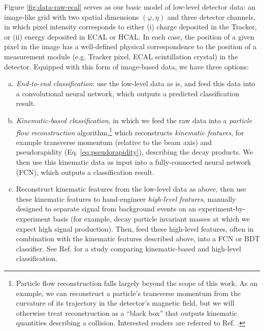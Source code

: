 \documentclass[11pt, a4paper]{article}
\begin{document}
Figure \ref{fig:data-raw-ecal} serves as our basic model of low-level detector data: an image-like grid with two spatial dimensions $ (\varphi, \eta) $ and three detector channels, in which pixel intensity corresponds to either (i) charge deposited in the Tracker, or (ii) energy deposited in ECAL or HCAL.
In each case, the position of a given pixel in the image has a well-defined physical correspondence to the position of a measurement module (e.g. Tracker pixel, ECAL scintillation crystal) in the detector.
Equipped with this form of image-based data, we have three options:
\begin{enumerate}[(a)]

    \item \textit{End-to-end classification}: use the low-level data as is, and feed this data into a convolutional neural network, which outputs a predicted classification result.

    \item \label{item:kinematic-classification} \textit{Kinematic-based classification}, in which we feed the raw data into a \textit{particle flow reconstruction} algorithm,\footnote{Particle flow reconstruction falls largely beyond the scope of this work.
    As an example, we can reconstruct a particle's transverse momentum from the curvature of its trajectory in the detector's magnetic field, but we will otherwise treat reconstruction as a ``black box'' that outputs kinematic quantities describing a collision.
    Interested readers are referred to Ref. \cite{particle-flow}.} which reconstructs \textit{kinematic features}, for example transverse momentum (relative to the beam axis) and pseudorapidity (Eq. \ref{eq:pseudorapidity}), describing the decay products.
    We then use this kinematic data as input into a fully-connected neural network (FCN), which outputs a classification result.

    \item \label{item:high-level-classification} Reconstruct kinematic features from the low-level data as above, then use these kinematic features to hand-engineer \textit{high-level features}, manually designed to separate signal from background events on an experiment-by-experiment basis (for example, decay particle invariant masses at which we expect high signal production).
    Then, feed these high-level features, often in combination with the kinematic features described above, into a FCN or BDT classifier.
    See Ref. \cite{baldi-higgs} for a study comparing kinematic-based and high-level classification.%


\end{enumerate}
\end{document}
